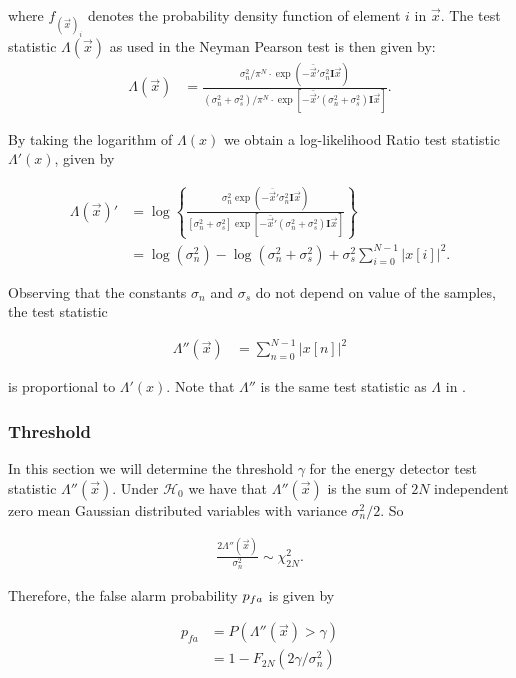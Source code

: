 \documentclass[a4paper, openany, oneside]{memoir}
\begin{document}
where $f_{(\vec{x})_i}$ denotes the probability density function of element $i$ in $\vec{x}$.  The test statistic $\Lambda(\vec{x})$ as used in the Neyman Pearson test is then given by:
\begin{align*}
\Lambda(\vec{x}) &=\frac{\sigma_n^2/\pi^N \cdot \exp(-\bar{\vec{x}}'\sigma_n^2\mathbf{I}\vec{x})}{(\sigma_n^2 + \sigma_s^2)/\pi^N \cdot \exp[-\bar{\vec{x}}'(\sigma_n^2+\sigma_s^2)\mathbf{I}\vec{x}]}.
\end{align*}


By taking the logarithm of $\Lambda(x)$ we obtain a log-likelihood Ratio test statistic $\Lambda'(x)$, given by

\begin{align*}
\Lambda(\vec{x})' &= \log \left\{
\frac{\sigma_n^2\exp(-\overline{\vec{x}}'\sigma_n^2\mathbf{I}\vec{x})}{[\sigma_n^2 + \sigma_s^2]\exp[-\bar{\vec{x}}'(\sigma_n^2+\sigma_s^2)\mathbf{I}\vec{x}]}\right\} \\
&= \log(\sigma_n^2) - \log(\sigma_n^2 + \sigma_s^2) +  \sigma_s^2 \sum_{i=0}^{N-1} |x[i]|^2. 
\end{align*}

Observing that the constants $\sigma_n$ and $\sigma_s$ do not depend on value of the samples, the test statistic 

\begin{align*}
\Lambda''(\vec{x}) &= \sum_{n=0}^{N-1} |x[n]|^2
\end{align*} 

is proportional to $\Lambda'(x)$. Note that $\Lambda''$ is the same test statistic as $\Lambda$ in .

\subsubsection{Threshold}
In this section we will determine the threshold $\gamma$ for the energy detector test statistic $\Lambda''(\vec{x})$.
Under $\mathcal{H}_0$ we have that $\Lambda''(\vec{x})$ is the sum of $2N$ independent zero mean Gaussian distributed variables
with variance $\sigma_n^2/2$. So

\begin{align}
    \frac{2\Lambda''(\vec{x})}{\sigma_n^2} \sim \chi^2_{2N}.
\end{align}

Therefore, the false alarm probability $p\ss{fa}$ is given by \cite{rugini2013small}

\begin{align*}
    p_{fa} &= P(\Lambda''(\vec{x}) > \gamma) \\
        &= 1-F_{2N} (2\gamma/\sigma_n^2)
\end{align*}
\end{document}
